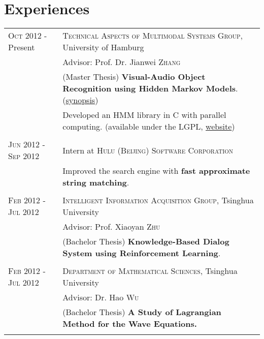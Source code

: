 \documentclass[a4paper,11pt]{article} %
\begin{document}

\section{Experiences}
\begin{tabular}{R{3.5cm}|p{11cm}}	
  \textsc{Oct 2012} - Present & \textsc{Technical Aspects of Multimodal Systems Group}, University of Hamburg \\
  & {\footnotesize Advisor:} Prof. Dr. Jianwei \textsc{Zhang} \\
  & {\footnotesize (Master Thesis) \textbf{Visual-Audio Object Recognition using Hidden Markov Models}. (\hyperlink{synopsis}{synopsis})} \\
  & {\footnotesize Developed an HMM library in C with parallel computing. (available under the LGPL, \href{http://github.com/hwp/notghmm}{website})} \\
   \\


  \textsc{Jun 2012 - Sep 2012} & Intern at \textsc{Hulu (Beijing) Software Corporation} \\
  & {\footnotesize Improved the search engine with \textbf{fast approximate string matching}.} \\
   \\


  \textsc{Feb 2012 - Jul 2012} & \textsc{Intelligent Information Acquisition Group}, Tsinghua University \\
  & {\footnotesize Advisor:} Prof. Xiaoyan \textsc{Zhu} \\
  & {\footnotesize (Bachelor Thesis) \textbf{Knowledge-Based Dialog System using Reinforcement Learning}.} \\
   \\


  \textsc{Feb 2012 - Jul 2012} & \textsc{Department of Mathematical Sciences}, Tsinghua University \\
  & {\footnotesize Advisor:} Dr. Hao \textsc{Wu} \\
  & {\footnotesize (Bachelor Thesis) \textbf{A Study of Lagrangian Method for the Wave Equations.}} \\
   \\


\end{tabular}
\end{document}
